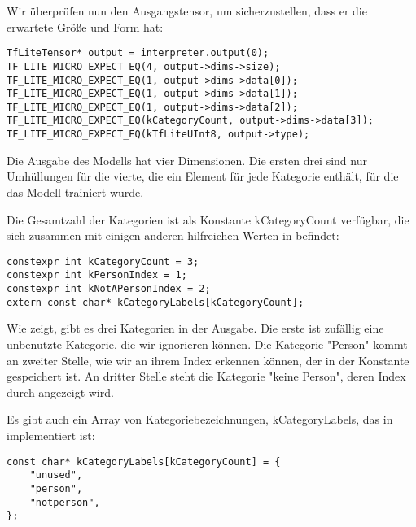 Wir überprüfen nun den Ausgangstensor, um sicherzustellen, dass er die erwartete Größe und Form hat:

\begin{code}
    \begin{lstlisting}
TfLiteTensor* output = interpreter.output(0);
TF_LITE_MICRO_EXPECT_EQ(4, output->dims->size);
TF_LITE_MICRO_EXPECT_EQ(1, output->dims->data[0]);
TF_LITE_MICRO_EXPECT_EQ(1, output->dims->data[1]);
TF_LITE_MICRO_EXPECT_EQ(1, output->dims->data[2]);
TF_LITE_MICRO_EXPECT_EQ(kCategoryCount, output->dims->data[3]);
TF_LITE_MICRO_EXPECT_EQ(kTfLiteUInt8, output->type);
  \end{lstlisting}
\end{code}

Die Ausgabe des Modells hat vier Dimensionen. Die ersten drei sind nur Umhüllungen für die vierte, die ein Element für jede Kategorie enthält, für die das Modell trainiert wurde.

Die Gesamtzahl der Kategorien ist als Konstante kCategoryCount verfügbar, die sich zusammen mit einigen anderen hilfreichen Werten in  befindet:

\begin{code}
    \begin{lstlisting}
constexpr int kCategoryCount = 3;
constexpr int kPersonIndex = 1;
constexpr int kNotAPersonIndex = 2;
extern const char* kCategoryLabels[kCategoryCount];
  \end{lstlisting}
\end{code}

Wie  zeigt, gibt es drei Kategorien in der Ausgabe. Die erste ist zufällig eine unbenutzte Kategorie, die wir ignorieren können. Die Kategorie "Person" kommt an zweiter Stelle, wie wir an ihrem Index erkennen können, der in der Konstante  gespeichert ist. An dritter Stelle steht die Kategorie "keine Person", deren Index durch  angezeigt wird.

Es gibt auch ein Array von Kategoriebezeichnungen, kCategoryLabels, das in  implementiert ist:

\begin{code}
    \begin{lstlisting}
const char* kCategoryLabels[kCategoryCount] = {
    "unused",
    "person",
    "notperson",
};
  \end{lstlisting}
\end{code}



